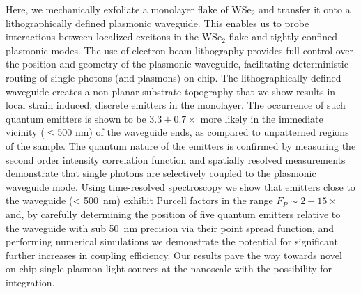 \documentclass[journal=nalefd,manuscript=letter]{achemso}
\begin{document}
Here, we mechanically exfoliate a monolayer flake of WSe$_2$ and transfer it onto a lithographically defined plasmonic waveguide.
This enables us to probe interactions between localized excitons in the WSe$_2$ flake and tightly confined plasmonic modes.
The use of electron-beam lithography provides full control over the position and geometry of the plasmonic waveguide, facilitating deterministic routing of single photons (and plasmons) on-chip.
The lithographically defined waveguide creates a non-planar substrate topography that we show results in local strain induced, discrete emitters in the monolayer.
The occurrence of such quantum emitters is shown to be $3.3 \pm 0.7\times$ more likely in the immediate vicinity ($\leq$500 nm) of the waveguide ends, as compared to unpatterned regions of the sample.
The quantum nature of the emitters is confirmed by measuring the second order intensity correlation function and spatially resolved measurements demonstrate that single photons are selectively coupled to the plasmonic waveguide mode.
Using time-resolved spectroscopy we show that emitters close to the waveguide (\SI{< 500}{\nano\meter}) exhibit Purcell factors in the range $F_P\sim2-15\times$ and, by carefully determining the position of five quantum emitters relative to the waveguide with sub \SI{50}{\nano\meter} precision via their point spread function, and performing numerical simulations we demonstrate the potential for significant further increases in coupling efficiency.
Our results pave the way towards novel on-chip single plasmon light sources at the nanoscale with the possibility for integration.
\end{document}
